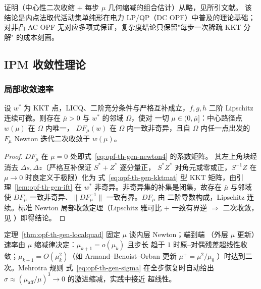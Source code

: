证明（中心性二次收缩 + 每步 $\mu$ 几何缩减的组合估计）从略，见所引文献。
该结论是内点法取代活动集单纯形在电力 LP/QP（DC OPF）中普及的理论基础；
对非凸 AC OPF 无对应多项式保证，复杂度结论只保留"每步一次稀疏 KKT 分解"
的成本刻画。

\subsection{IPM 收敛性理论}\label{sec:opf-th-gen-convergence}

\subsubsection{局部收敛速率}

\begin{theorem}\label{thm:opf-th-gen-localquad}
设 $w^*$ 为 KKT 点，LICQ、二阶充分条件与严格互补成立，$f,g,h$ 二阶
Lipschitz 连续可微。则存在 $\bar\mu>0$ 与 $w^*$ 的邻域 $\Omega$，使对
一切 $\mu\in(0,\bar\mu]$：中心路径点 $w(\mu)$ 在 $\Omega$ 内唯一，
$DF_\mu(w)$ 在 $\Omega$ 内一致非奇异，且自 $\Omega$ 内任一点出发的
$F_\mu$ Newton 迭代二次收敛于 $w(\mu)$。
\end{theorem}

\begin{proof}
$DF_\mu$ 在 $\mu=0$ 处即式~\eqref{eq:opf-th-gen-newton4} 的系数矩阵。
其左上角块经消去 $\Delta s,\Delta z$（严格互补保证 $S^*+Z^*$ 逐分量正，
$S^*Z^*$ 对角元或零或正，$S^{-1}Z$ 在 $\mu\to0$ 时良定义于极限）化为
式~\eqref{eq:opf-th-gen-kktmat} 型 KKT 矩阵，由引理~\ref{lem:opf-th-gen-ift}
在 $w^*$ 非奇异。非奇异集的补集是闭集，故存在 $\bar\mu$ 与邻域使
$DF_\mu$ 一致非奇异、$\lVert DF_\mu^{-1}\rVert$ 一致有界。$DF_\mu$ 由
二阶导数构成，Lipschitz 连续。标准 Newton 局部收敛定理（Lipschitz 雅可比
+ 一致有界逆 $\Rightarrow$ 二次收敛，见
\cite{opft:nocedal-wright}）即得结论。
\end{proof}

\begin{remark}[超线性与二次端到端速率]\label{rem:opf-th-gen-superlinear}
定理~\ref{thm:opf-th-gen-localquad} 固定 $\mu$ 谈内层 Newton；端到端
（外层 $\mu$ 更新）速率由 $\mu$ 缩减律决定：$\mu_{k+1}=o(\mu_k)$ 且步长
趋于 $1$ 时原--对偶残差超线性收敛；$\mu_{k+1}=O(\mu_k^2)$（如
Armand--Benoist--Orban 更新 $\mu^+=\mu^2/\mu_0$
\cite{opft:armand-benoist-orban}）时达到二次。Mehrotra 规则
式~\eqref{eq:opf-th-gen-sigma} 在全步恢复时自动给出
$\sigma\approx(\mu_{\mathrm{aff}}/\mu)^3\to0$ 的激进缩减，实践中接近
超线性\cite{opft:wright-ipm}。
\end{remark}


